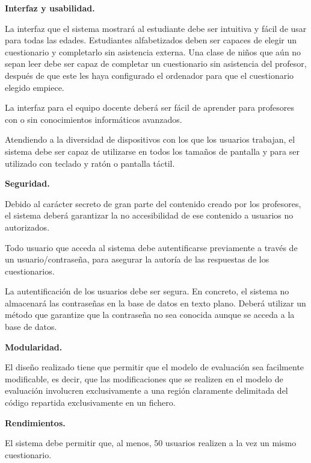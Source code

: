 \begin{rnf0}
	\item \textbf{Interfaz y usabilidad.}
		\begin{rnf0*}
			\item La interfaz que el sistema mostrará al estudiante debe ser intuitiva y fácil de usar para todas las edades. Estudiantes alfabetizados deben ser capaces de elegir un cuestionario y completarlo sin asistencia externa. Una clase de niños que aún no sepan leer debe ser capaz de completar un cuestionario sin asistencia del profesor, después de que este les haya configurado el ordenador para que el cuestionario elegido empiece.\label{RNFusabilidad}
			\item La interfaz para el equipo docente deberá ser fácil de aprender para profesores con o sin conocimientos informáticos avanzados. 
			\item Atendiendo a la diversidad de dispositivos con los que los usuarios trabajan, el sistema debe ser capaz de utilizarse en todos los tamaños de pantalla y para ser utilizado con teclado y ratón o pantalla táctil.
		\end{rnf0*}
	\item \textbf{Seguridad.}
		\begin{rnf0*}
			\item Debido al carácter secreto de gran parte del contenido creado por los profesores, el sistema deberá garantizar la no accesibilidad de ese contenido a usuarios no autorizados.
			\item Todo usuario que acceda al sistema debe autentificarse previamente a través de un usuario/contraseña, para asegurar la autoría de las respuestas de los cuestionarios.
			\item La autentificación de los usuarios debe ser segura. En concreto, el sistema no almacenará las contraseñas en la base de datos en texto plano. Deberá utilizar un método que garantize que la contraseña no sea conocida aunque se acceda a la base de datos.
		\end{rnf0*}
	\item \textbf{Modularidad.}
		\begin{rnf0*}
			\item El diseño realizado tiene que permitir que el modelo de evaluación sea facilmente modificable, es decir, que las modificaciones que se realizen en el modelo de evaluación involucren exclusivamente a una región claramente delimitada del código repartida exclusivamente en un fichero. \label{RNF:mofularidad}
		\end{rnf0*}
	\item \textbf{Rendimientos.}
		\begin{rnf0*}
			\item El sistema debe permitir que, al menos, 50 usuarios realizen a la vez un mismo cuestionario.
		\end{rnf0*}
\end{rnf0}


